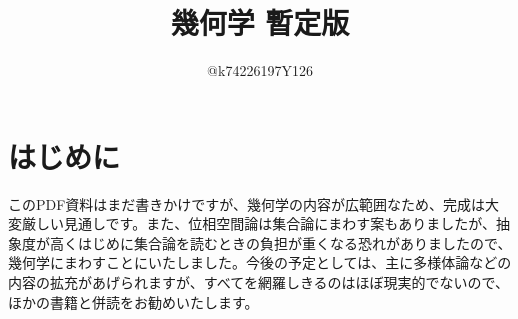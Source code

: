\documentclass[10pt,a4paper,titlepage]{jsarticle}
\title{幾何学 暫定版}
\author{@k74226197Y126}
\begin{document}
\maketitle
{}
\section*{はじめに}
\par
このPDF資料はまだ書きかけですが、幾何学の内容が広範囲なため、完成は大変厳しい見通しです。また、位相空間論は集合論にまわす案もありましたが、抽象度が高くはじめに集合論を読むときの負担が重くなる恐れがありましたので、幾何学にまわすことにいたしました。今後の予定としては、主に多様体論などの内容の拡充があげられますが、すべてを網羅しきるのはほぼ現実的でないので、ほかの書籍と併読をお勧めいたします。
\tableofcontents
\clearpage
{}


\clearpage

\clearpage

\clearpage

\clearpage

\clearpage

\clearpage

\clearpage

\clearpage

\clearpage

\clearpage


\clearpage

\clearpage

\clearpage

\clearpage

\clearpage

\clearpage


\clearpage

\clearpage

\clearpage

\clearpage

\end{document}
